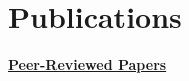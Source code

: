 \documentclass[11pt, letterpaper, roman]{moderncv} %
\begin{document}


\section{Publications}

\noindent\underline{\textbf{Peer-Reviewed Papers}}
\vspace{6pt}
\end{document}
